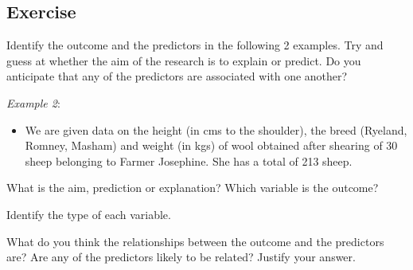\documentclass[
]{gitbook}
\providecommand{\tightlist}{%
  \setlength{\itemsep}{0pt}\setlength{\parskip}{0pt}}
\begin{document}

\newpage

\hypertarget{exercise}{%
\subsection{Exercise}\label{exercise}}

Identify the outcome and the predictors in the following 2 examples. Try and guess at whether the aim of the research is to explain or predict. Do you anticipate that any of the predictors are associated with one another?

\emph{Example 2}:

\begin{itemize}
\tightlist
\item
  We are given data on the height (in cms to the shoulder), the breed (Ryeland, Romney, Masham) and weight (in kgs) of wool obtained after shearing of 30 sheep belonging to Farmer Josephine. She has a total of 213 sheep.
\end{itemize}

What is the aim, prediction or explanation? Which variable is the outcome?


Identify the type of each variable.


What do you think the relationships between the outcome and the predictors are? Are any of the predictors likely to be related? Justify your answer.

\end{document}

